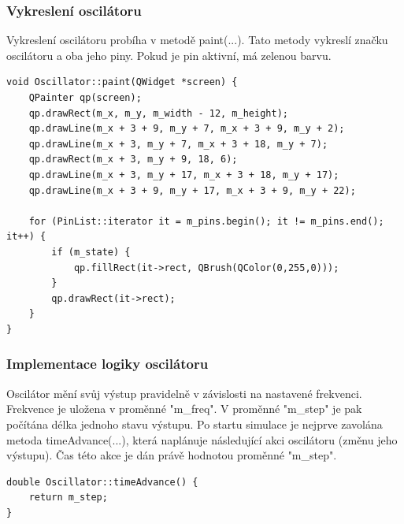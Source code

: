 \subsubsection{Vykreslení oscilátoru }

Vykreslení oscilátoru probíha v metodě paint(...). Tato metody vykreslí značku oscilátoru a oba jeho piny. Pokud je pin aktivní, má zelenou barvu.

\begin{lstlisting}
void Oscillator::paint(QWidget *screen) {
	QPainter qp(screen);
	qp.drawRect(m_x, m_y, m_width - 12, m_height);
	qp.drawLine(m_x + 3 + 9, m_y + 7, m_x + 3 + 9, m_y + 2);
	qp.drawLine(m_x + 3, m_y + 7, m_x + 3 + 18, m_y + 7);
	qp.drawRect(m_x + 3, m_y + 9, 18, 6);
	qp.drawLine(m_x + 3, m_y + 17, m_x + 3 + 18, m_y + 17);
	qp.drawLine(m_x + 3 + 9, m_y + 17, m_x + 3 + 9, m_y + 22);

	for (PinList::iterator it = m_pins.begin(); it != m_pins.end(); it++) {
		if (m_state) {
			qp.fillRect(it->rect, QBrush(QColor(0,255,0)));
		}
		qp.drawRect(it->rect);
	}
}
\end{lstlisting}

\subsubsection{Implementace logiky oscilátoru}

Oscilátor mění svůj výstup pravidelně v závislosti na nastavené frekvenci. Frekvence je uložena v proměnné "m\_freq". V proměnné "m\_step" je pak počítána délka jednoho stavu výstupu. Po startu simulace je nejprve zavolána metoda timeAdvance(...), která naplánuje následující akci oscilátoru (změnu jeho výstupu). Čas této akce je dán právě hodnotou proměnné "m\_step".

\begin{lstlisting}
double Oscillator::timeAdvance() {
	return m_step;
}
\end{lstlisting}


